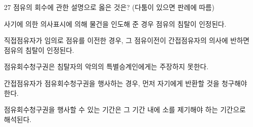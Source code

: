 \begin{question}{27}
점유의 회수에 관한 설명으로 옳은 것은? (다툼이 있으면 판례에 따름)
\begin{choices}
  \item 사기에 의한 의사표시에 의해 물건을 인도해 준 경우 점유의 침탈이 인정된다.
  \item 직접점유자가 임의로 점유를 이전한 경우, 그 점유이전이 간접점유자의 의사에 반하면 점유의 침탈이 인정된다.
  \item 점유회수청구권은 침탈자의 악의의 특별승계인에게는 주장하지 못한다.
  \item 간접점유자가 점유회수청구권을 행사하는 경우, 먼저 자기에게 반환할 것을 청구해야 한다.
  \item 점유회수청구권을 행사할 수 있는 기간은 그 기간 내에 소를 제기해야 하는 기간으로 해석된다.
\end{choices}
\end{question}
